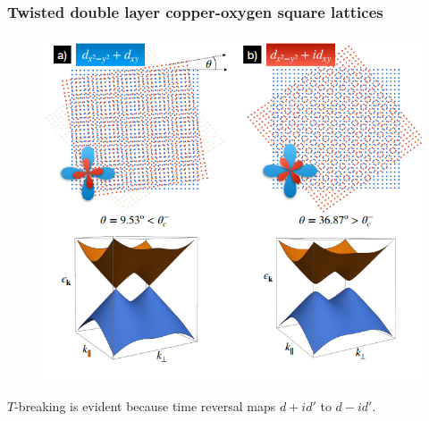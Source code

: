 \documentclass{beamer}
\begin{document}
\begin{frame}
\frametitle{Twisted double layer copper-oxygen square lattices}
\begin{figure}[h]
\centering
\includegraphics[scale=0.4]{pic/p4.png}
\end{figure}
$T$-breaking is evident because time reversal maps $d+id'$ to $d-id'$.
\end{frame}
\end{document}
